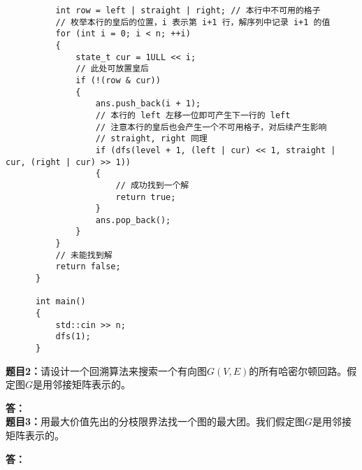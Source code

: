 \documentclass[12pt,a4paper]{ctexart}
\begin{document}
\begin{verbatim}
          int row = left | straight | right; // 本行中不可用的格子
          // 枚举本行的皇后的位置，i 表示第 i+1 行，解序列中记录 i+1 的值
          for (int i = 0; i < n; ++i)
          {
              state_t cur = 1ULL << i;
              // 此处可放置皇后
              if (!(row & cur))
              {
                  ans.push_back(i + 1);
                  // 本行的 left 左移一位即可产生下一行的 left
                  // 注意本行的皇后也会产生一个不可用格子，对后续产生影响
                  // straight, right 同理
                  if (dfs(level + 1, (left | cur) << 1, straight | cur, (right | cur) >> 1))
                  {
                      // 成功找到一个解
                      return true;
                  }
                  ans.pop_back();
              }
          }
          // 未能找到解
          return false;
      }

      int main()
      {
          std::cin >> n;
          dfs(1);
      }
  \end{verbatim}

  \newpage

  \vspace{10pt}
  \noindent
  {\bf 题目2：}请设计一个回溯算法来搜索一个有向图$G(V,E)$的所有哈密尔顿回路。假定图$G$是用邻接矩阵表示的。

  \vspace{5pt}
  \noindent
  {\bf 答：}\\


  \vspace{10pt}
  \noindent
  {\bf 题目3：}用最大价值先出的分枝限界法找一个图的最大团。我们假定图$G$是用邻接矩阵表示的。

  \vspace{5pt}
  \noindent
  {\bf 答：}\\



\end{document}
